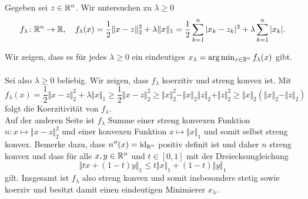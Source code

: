 
Gegeben sei $z\in\mathbb{R}^n$. Wir untersuchen zu $\lambda\geq 0$
\begin{displaymath}
 f_\lambda\colon \mathbb{R}^n\to\mathbb{R},\quad f_\lambda(x)=\frac{1}{2}\Vert x-z\Vert_2^2+\lambda\Vert x\Vert_1=\frac{1}{2}\sum_{k=1}^n |x_k-z_k|^2+\lambda\sum_{k=1}^n|x_k|.
\end{displaymath}
\begin{compactenum}[(i)]
 \item Wir zeigen, dass es für jedes $\lambda\geq 0$ ein eindeutiges $x_\lambda = \arg\min_{x\in\mathbb{R}^n}f_\lambda(x)$ gibt.\\\\
Sei also $\lambda\geq 0$ beliebig.
 Wir zeigen, dass $f_\lambda$ koerzitiv und streng konvex ist. Mit
 \begin{displaymath}
  f_\lambda(x)=\frac{1}{2}\Vert x-z\Vert_2^2+\lambda\Vert x\Vert_1\geq \frac{1}{2}\Vert x-z\Vert_2^2\geq \Vert x\Vert_2^2-\Vert x\Vert_2\Vert z\Vert_2+\Vert z \Vert_2^2\geq \Vert x\Vert_2(\Vert x\Vert_2-\Vert z\Vert_2)
 \end{displaymath}
 folgt die Koerzitivität von $f_\lambda$.\\
 Auf der anderen Seite ist $f_\lambda$ Summe einer streng konvexen Funktion $n: x\mapsto \Vert x-z\Vert_2^2$ und einer konvexen Funktion $x\mapsto \Vert x\Vert_1$ und
 somit selbst streng konvex. Bemerke dazu, dass $n''(x)=\operatorname{id}_{\mathbb{R}^n}$ positiv definit ist und daher $n$ streng konvex und dass für alle $x,y\in\mathbb{R}^n$ und $t\in [0,1]$
 mit der Dreiecksungleichung
 \begin{displaymath}
  \Vert tx+(1-t)y\Vert_1\leq t\Vert x\Vert_1+(1-t)\Vert y\Vert_1
 \end{displaymath}
 gilt.
 Insgesamt ist $f_\lambda$ also streng konvex und somit insbesondere stetig sowie koerziv und besitzt damit einen eindeutigen Minimierer $x_\lambda$.
 \\
 \item


\end{compactenum}

